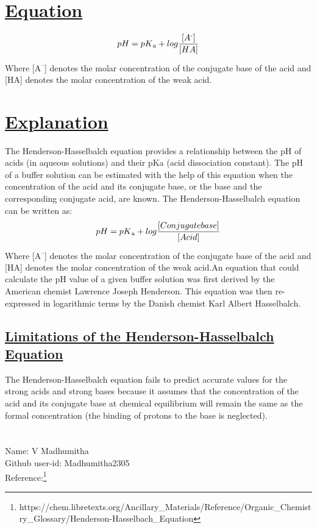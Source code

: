 \section*{\underline{Equation}}
\[ pH=pK\textsubscript{a}+log\frac{[A\textsuperscript{-}]}{[HA]}\]
Where [A\textsuperscript{–}] denotes the molar concentration of the conjugate base of the acid and [HA] denotes the molar concentration of the weak acid.
\section*{\underline{Explanation}}
The Henderson-Hasselbalch equation provides a relationship between the pH of acids (in aqueous solutions) and their pKa (acid dissociation constant). The pH of a buffer solution can be estimated with the help of this equation when the concentration of the acid and its conjugate base, or the base and the corresponding conjugate acid, are known.
The Henderson-Hasselbalch equation can be written as:
\[ pH=pK\textsubscript{a}+log\frac{[Conjugate  base]}{[Acid]}\]
Where [A\textsuperscript{–}] denotes the molar concentration of the conjugate base of the acid and [HA] denotes the molar concentration of the weak acid.An equation that could calculate the pH value of a given buffer solution was first derived by the American chemist Lawrence Joseph Henderson. This equation was then re-expressed in logarithmic terms by the Danish chemist Karl Albert Hasselbalch. 

\subsection*{\underline{Limitations of the Henderson-Hasselbalch Equation}}
The Henderson-Hasselbalch equation fails to predict accurate values for the strong acids and strong bases because it assumes that the concentration of the acid and its conjugate base at chemical equilibrium will remain the same as the formal concentration (the binding of protons to the base is neglected).
\section*{}
Name: V Madhumitha\\
Github user-id: Madhumitha2305\\
Reference:\footnote{https://chem.libretexts.org/Ancillary\_Materials/Reference/Organic\_Chemistry\_Glossary/Henderson-Hasselbach\_Equation}

